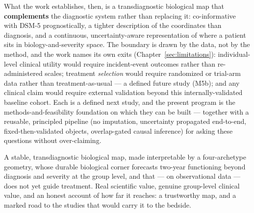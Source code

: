What the work establishes, then, is a transdiagnostic biological map that \textbf{complements} the diagnostic
system rather than replacing it: co-informative with DSM-5 prognostically, a tighter description of the
coordinates than diagnosis, and a continuous, uncertainty-aware representation of where a patient sits in
biology-and-severity space. The boundary is drawn by the data, not by the method, and the work names its own
exits (Chapter~\ref{sec:limitations}): individual-level clinical utility would require incident-event outcomes
rather than re-administered scales; treatment \emph{selection} would require randomized or trial-arm data rather
than treatment-as-usual --- a defined future study (M5b); and any clinical claim would require external
validation beyond this internally-validated baseline cohort. Each is a defined next study, and the present
program is the methods-and-feasibility foundation on which they can be built --- together with a reusable,
principled pipeline (no imputation, uncertainty propagated end-to-end, fixed-then-validated objects,
overlap-gated causal inference) for asking these questions without over-claiming.

\begin{keyresult}
A stable, transdiagnostic biological map, made interpretable by a four-archetype geometry, whose durable
biological corner forecasts two-year functioning beyond diagnosis and severity at the group level, and that ---
on observational data --- does not yet guide treatment. Real scientific value, genuine group-level clinical
value, and an honest account of how far it reaches: a trustworthy map, and a marked road to the studies that
would carry it to the bedside.
\end{keyresult}
